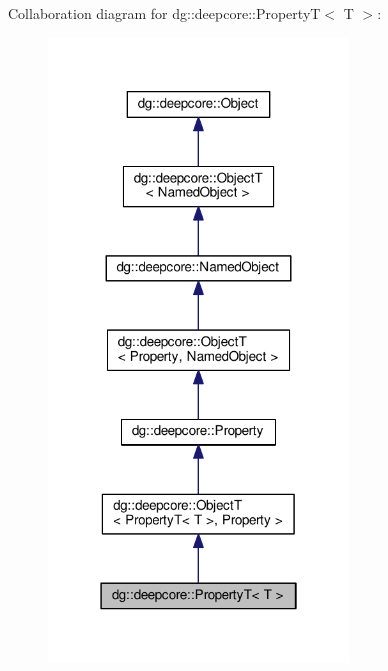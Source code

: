 Collaboration diagram for dg\+:\+:deepcore\+:\+:PropertyT$<$ T $>$\+:
\nopagebreak
\begin{figure}[H]
\begin{center}
\leavevmode
\includegraphics[width=226pt]{structdg_1_1deepcore_1_1_property_t__coll__graph}
\end{center}
\end{figure}
